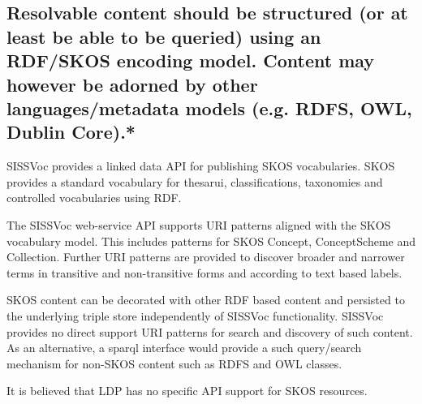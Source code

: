 \documentclass[10pt,a4paper]{article}
\begin{document}
\begin{flushleft}
% 


% 
%   
% 
% 
% 


\subsection{Resolvable content should be structured (or at least be able to be queried)
  using an RDF/SKOS encoding model. Content may however be adorned by other
  languages/metadata models (e.g. RDFS, OWL, Dublin Core).* }

  SISSVoc provides a linked data API for publishing SKOS vocabularies.  SKOS
provides a standard vocabulary for thesarui, classifications, taxonomies and
controlled vocabularies using RDF.

  The SISSVoc web-service API supports URI patterns aligned with the SKOS
vocabulary model. This includes patterns for SKOS Concept,
ConceptScheme and Collection. Further URI patterns are provided to discover
broader and narrower terms in transitive and non-transitive forms and according
to text based labels. 

  SKOS content can be decorated with other RDF based
content and persisted to the underlying triple store independently of SISSVoc
functionality. SISSVoc provides
no direct support URI patterns for search and discovery of such content. As an
alternative, a sparql interface would provide a
such query/search mechanism for non-SKOS content such as RDFS and OWL classes. 

It is believed that LDP has no specific API support for SKOS resources.


\end{flushleft}
\end{document}
